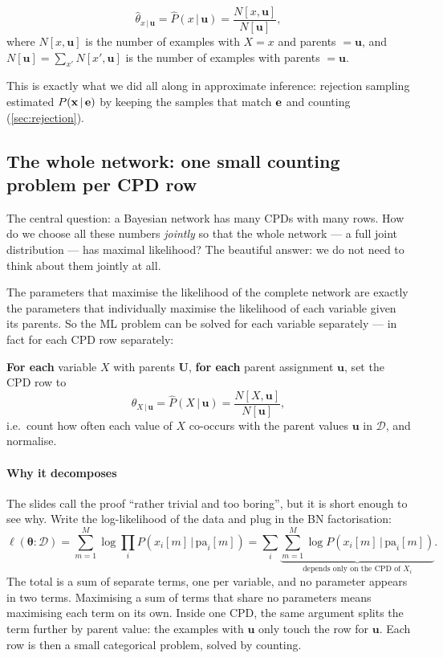 \documentclass[11pt, oneside]{book}
\newcommand{\Prob}{\mathbb{P}}           %
\newcommand{\dataset}{\mathcal{D}}       %
\newcommand{\params}{\boldsymbol{\theta}}   %
\newcommand{\given}{\,\vert\,}           %
\newcommand{\pa}{\mathrm{pa}}            %
\newcommand{\bx}{\mathbf{x}}  \newcommand{\by}{\mathbf{y}}
\let\originalsubsection\subsection
\renewcommand{\subsection}{\Needspace{6\baselineskip}\originalsubsection}
\begin{document}
\begin{thmbox}[title={ML estimate of a conditional distribution}, unbreakable]
\[
\hat\theta_{x \given \mathbf{u}} = \hat P(x \given \mathbf{u}) = \frac{N[x, \mathbf{u}]}{N[\mathbf{u}]},
\]
where $N[x, \mathbf{u}]$ is the number of examples with $X = x$ and parents
$= \mathbf{u}$, and $N[\mathbf{u}] = \sum_{x'} N[x', \mathbf{u}]$ is the number
of examples with parents $= \mathbf{u}$.
\end{thmbox}

This is exactly what we did all along in approximate inference: rejection
sampling estimated $P(\bx \given \be)$ by keeping the samples that match $\mathbf{e}$
and counting (\cref{sec:rejection}).

\subsection{The whole network: one small counting problem per CPD row}

The central question: a Bayesian network has many CPDs with many rows. How do
we choose all these numbers \emph{jointly} so that the whole network --- a
full joint distribution --- has maximal likelihood? The beautiful answer: we
do not need to think about them jointly at all.

\begin{thmbox}[title={Decomposition of the likelihood; ML learning for BNs}, unbreakable]
The parameters that maximise the likelihood of the complete network are
exactly the parameters that individually maximise the likelihood of each
variable given its parents. So the ML problem can be solved for each variable
separately --- in fact for each CPD row separately:\par\smallskip
\textbf{For each} variable $X$ with parents $\mathbf{U}$, \textbf{for each}
parent assignment $\mathbf{u}$, set the CPD row to
\[
\hat\theta_{X \given \mathbf{u}} = \hat P(X \given \mathbf{u}) = \frac{N[X, \mathbf{u}]}{N[\mathbf{u}]},
\]
i.e.\ count how often each value of $X$ co-occurs with the parent values
$\mathbf{u}$ in $\dataset$, and normalise.
\end{thmbox}

\paragraph{Why it decomposes} The slides call the proof ``rather trivial and
too boring'', but it is short enough to see why. Write the log-likelihood of
the data and plug in the BN factorisation:
\[
\ell(\params : \dataset) = \sum_{m=1}^{M} \log \prod_{i} P(x_i[m] \given \pa_i[m])
= \sum_{i} \underbrace{\sum_{m=1}^{M} \log P(x_i[m] \given \pa_i[m])}_{\text{depends only on the CPD of } X_i} .
\]
The total is a sum of separate terms, one per variable, and no parameter
appears in two terms. Maximising a sum of terms that share no parameters means
maximising each term on its own. Inside one CPD, the same argument splits the
term further by parent value: the examples with $\mathbf{u}$ only touch the row
for $\mathbf{u}$. Each row is then a small categorical problem, solved by
counting.
\end{document}
